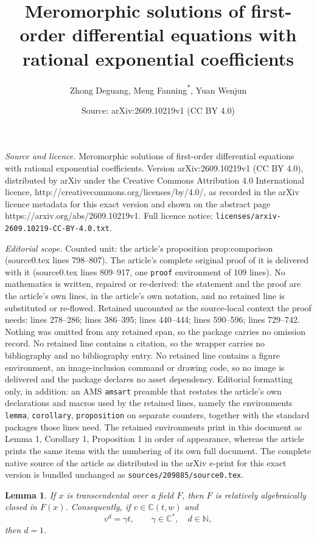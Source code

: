 \documentclass[10pt,a4paper]{amsart}
\title{Meromorphic solutions of first-order differential equations with rational exponential coefficients}
\author{Zhong Deguang, Meng Fanning\textsuperscript{*}, Yuan Wenjun}
\date{Source: arXiv:2609.10219v1 (CC BY 4.0)}
\newtheorem{lemma}{Lemma}
\newcommand{\C}{\mathbb C}
\newcommand{\N}{\mathbb N}
\begin{document}
\maketitle

\noindent\emph{Source and licence.} Meromorphic solutions of first-order differential equations with rational exponential coefficients. Version arXiv:2609.10219v1 (CC BY 4.0), distributed by arXiv under the Creative Commons Attribution 4.0 International licence, http://creativecommons.org/licenses/by/4.0/, as recorded in the arXiv licence metadata for this exact version and shown on the abstract page https://arxiv.org/abs/2609.10219v1. Full licence notice: \texttt{licenses/arxiv-2609.10219-CC-BY-4.0.txt}.\par\smallskip

\noindent\textit{Editorial scope.} Counted unit: the article's proposition prop:comparison (source0.tex lines 798--807). The article's complete original proof of it is delivered with it (source0.tex lines 809--917, one \texttt{proof} environment of 109 lines). No mathematics is written, repaired or re-derived: the statement and the proof are the article's own lines, in the article's own notation, and no retained line is substituted or re-flowed.  Retained uncounted as the source-local context the proof needs: lines 278--286; lines 386--395; lines 440--444; lines 590--596; lines 729--742.  Nothing was omitted from any retained span, so the package carries no omission record.  No retained line contains a citation, so the wrapper carries no bibliography and no bibliography entry.  No retained line contains a figure environment, an image-inclusion command or drawing code, so no image is delivered and the package declares no asset dependency.  Editorial formatting only, in addition: an AMS \texttt{amsart} preamble that restates the article's own declarations and macros used by the retained lines, namely the environments \texttt{lemma}, \texttt{corollary}, \texttt{proposition} on separate counters, together with the standard packages those lines need.  The retained environments print in this document as Lemma 1, Corollary 1, Proposition 1 in order of appearance, whereas the article prints the same items with the numbering of its own full document.  The complete native source of the article as distributed in the arXiv e-print for this exact version is bundled unchanged as \texttt{sources/209885/source0.tex}.
\begin{lemma}
\label{lem:relative}
If $x$ is transcendental over a field $F$, then $F$ is relatively
algebraically closed in $F(x)$. Consequently, if $v\in\C(t,w)$ and
\[
 v^d=\gamma t,\qquad \gamma\in\C^*,\quad d\in\N,
\]
then $d=1$.
\end{lemma}
\end{document}
